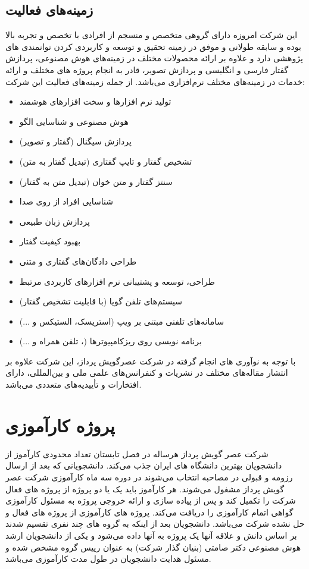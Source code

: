 \subsection{زمینه‌های فعالیت}

این شرکت امروزه دارای گروهی متخصص و منسجم از افرادی با تخصص و تجربه بالا بوده و سابقه طولانی و موفق در زمینه تحقیق و توسعه و کاربردی کردن توانمندی های پژوهشی دارد و علاوه بر ارائه محصولات مختلف در زمینه‌های هوش مصنوعی، پردازش گفتار فارسی و انگلیسی و پردازش تصویر، قادر به انجام پروژه های مختلف و ارائه خدمات در زمینه‌های مختلف نرم‌افزاری می‌باشد. از جمله زمینه‌های فعالیت این شرکت:
\begin{itemize}
	\item تولید نرم افزارها و سخت افزارهای هوشمند
	\item هوش مصنوعی و شناسایی الگو
	\item پردازش سیگنال (گفتار و تصویر)
	\item تشخیص گفتار و تایپ گفتاری (تبدیل گفتار به متن)
	\item سنتز گفتار و متن خوان (تبدیل متن به گفتار)
	\item شناسایی افراد از روی صدا
	\item پردازش زبان طبیعی
	\item بهبود كیفیت گفتار
	\item طراحی دادگان‌های گفتاری و متنی
	\item طراحی، توسعه و پشتیبانی نرم افزارهای کاربردی مرتبط
	\item سیستم‌های تلفن گویا (با قابلیت تشخیص گفتار)
	\item سامانه‌های تلفنی مبتنی بر ویپ (استریسک، الستیکس و ...)
	\item برنامه نویسی روی ریزکامپیوترها (، تلفن همراه و ...)
\end{itemize}

با توجه به نوآوری های انجام گرفته در شركت عصرگویش پرداز، این شرکت علاوه بر انتشار مقاله‌های مختلف در نشریات و کنفرانس‌های علمی ملی و بین‌المللی، دارای افتخارات و تأییدیه‌های متعددی می‌باشد.

\section{پروژه کارآموزی}
شرکت عصر گویش پرداز هرساله در فصل تابستان تعداد محدودی کارآموز از دانشجویان بهترین دانشگاه های ایران جذب می‌کند. دانشجویانی که بعد از ارسال رزومه و قبولی در مصاحبه انتخاب می‌شوند در دوره سه ماه کارآموزی شرکت عصر گویش پرداز مشغول می‌شوند. هر کارآموز باید یک یا دو پروژه از پروژه های فعال شرکت را تکمیل کند و پس از پیاده سازی و ارائه خروجی پروژه به مسئول کارآموزی گواهی اتمام کارآموزی را دریافت می‌کند.
پروژه های کارآموزی از پروژه های فعال و حل نشده شرکت می‌باشد. دانشجویان بعد از اینکه به گروه های چند نفری تقسیم شدند بر اساس دانش و علاقه آنها یک پروژه به آنها داده می‌شود و یکی از دانشجویان ارشد هوش مصنوعی دکتر صامتی (بنیان گذار شرکت) به عنوان رییس گروه مشخص شده و مسئول هدایت دانشجویان در طول مدت کارآموزی می‌باشد.

